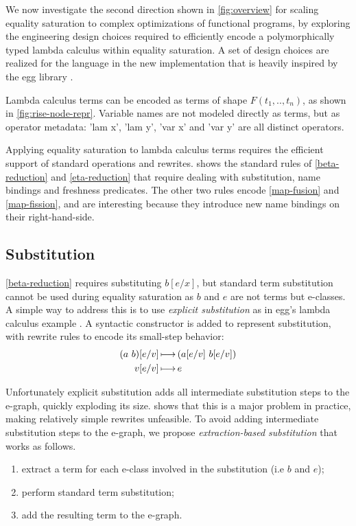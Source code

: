 We now investigate the second direction shown in \cref{fig:overview} for scaling equality saturation to complex optimizations of functional programs, by exploring the engineering design choices required to efficiently encode a polymorphically typed lambda calculus within equality saturation.
A set of design choices are realized for the \Rise{} language in the new \kles{} implementation that is heavily inspired by the egg library \cite{willsey2021-egg}.

Lambda calculus terms can be encoded as terms of shape $F(t_1, .., t_n)$, as shown in \cref{fig:rise-node-repr}.
Variable names are not modeled directly as terms, but as operator metadata: 'lam x', 'lam y', 'var x' and 'var y' are all distinct operators.

Applying equality saturation to lambda calculus terms requires the efficient support of standard operations and rewrites.
 shows the standard rules of \ref{beta-reduction} and \ref{eta-reduction} that require dealing with substitution, name bindings and freshness predicates.
The other two rules encode \ref{map-fusion} and \ref{map-fission}, and are interesting because they introduce new name bindings on their right-hand-side.

\subsection{Substitution}
\label{substitution}

\ref{beta-reduction} requires substituting $b[e/x]$, but standard term substitution cannot be used during equality saturation as $b$ and $e$ are not terms but e-classes.
A simple way to address this is to use \emph{explicit substitution} as in egg's lambda calculus example \cite{willsey2021-egg}.
A syntactic constructor is added to represent substitution, with rewrite rules to encode its small-step behavior:
\begin{align*}
(a~b)[e/v] &\operatorname{\longmapsto}{} (a[e/v]~b[e/v]) \\
v[e/v] &\operatorname{\longmapsto}{} e
\end{align*}

Unfortunately explicit substitution adds all intermediate substitution steps to the e-graph, quickly exploding its size.
 shows that this is a major problem in practice, making relatively simple rewrites unfeasible.
To avoid adding intermediate substitution steps to the e-graph, we propose \emph{extraction-based substitution} that works as follows.
\begin{enumerate}
    \item extract a term for each e-class involved in the substitution (i.e $b$ and $e$);
    \item perform standard term substitution;
    \item add the resulting term to the e-graph.
\end{enumerate}

